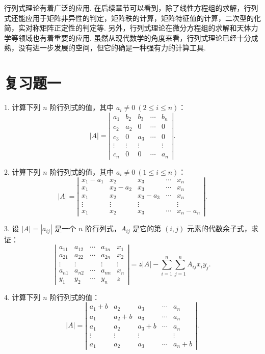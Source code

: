 \documentclass[UTF8,12pt,a4paper,fontset=fandol]{ctexart}
\begin{document}
行列式理论有着广泛的应用. 在后续章节可以看到，除了线性方程组的求解，行列式还能应用于矩阵非异性的判定，矩阵秩的计算，矩阵特征值的计算，二次型的化简，实对称矩阵正定性的判定等. 另外，行列式理论在微分方程组的求解和天体力学等领域也有着重要的应用. 虽然从现代数学的角度来看，行列式理论已经十分成熟，没有进一步发展的空间，但它的确是一种强有力的计算工具.

\section*{复习题一}

1. 计算下列 $n$ 阶行列式的值，其中 $a_i\ne0\ (2\le i\le n)$：
\[
|A|=
\left|\begin{array}{ccccc}
a_1&b_2&b_3&\cdots&b_n\\
c_2&a_2&0&\cdots&0\\
c_3&0&a_3&\cdots&0\\
\vdots&\vdots&\vdots&&\vdots\\
c_n&0&0&\cdots&a_n
\end{array}\right|.
\]

2. 计算下列 $n$ 阶行列式的值，其中 $a_i\ne0\ (1\le i\le n)$：
\[
|A|=
\left|\begin{array}{ccccc}
x_1-a_1&x_2&x_3&\cdots&x_n\\
x_1&x_2-a_2&x_3&\cdots&x_n\\
x_1&x_2&x_3-a_3&\cdots&x_n\\
\vdots&\vdots&\vdots&&\vdots\\
x_1&x_2&x_3&\cdots&x_n-a_n
\end{array}\right|.
\]

3. 设 $|A|=|a_{ij}|$ 是一个 $n$ 阶行列式，$A_{ij}$ 是它的第 $(i,j)$ 元素的代数余子式，求证：
\[
\left|\begin{array}{ccccc}
a_{11}&a_{12}&\cdots&a_{1n}&x_1\\
a_{21}&a_{22}&\cdots&a_{2n}&x_2\\
\vdots&\vdots&&\vdots&\vdots\\
a_{n1}&a_{n2}&\cdots&a_{nn}&x_n\\
y_1&y_2&\cdots&y_n&z
\end{array}\right|
=z|A|-\sum_{i=1}^n\sum_{j=1}^n A_{ij}x_iy_j.
\]

4. 计算下列 $n$ 阶行列式的值：
\[
|A|=
\left|\begin{array}{ccccc}
a_1+b&a_2&a_3&\cdots&a_n\\
a_1&a_2+b&a_3&\cdots&a_n\\
a_1&a_2&a_3+b&\cdots&a_n\\
\vdots&\vdots&\vdots&&\vdots\\
a_1&a_2&a_3&\cdots&a_n+b
\end{array}\right|.
\]
\end{document}
